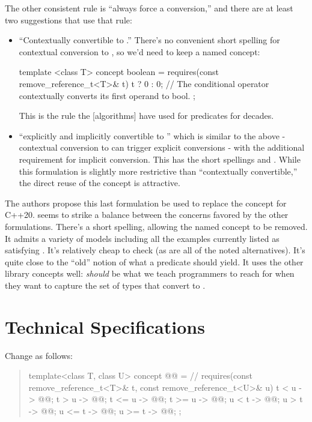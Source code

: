 The other consistent rule is ``always force a conversion,'' and there are at least two suggestions
that use that rule:
\begin{itemize}
\item ``Contextually convertible to .'' There's no convenient short spelling for
  contextual conversion to , so we'd need to keep a named concept:
  \begin{codeblock}
  template <class T>
  concept boolean = requires(const remove_reference_t<T>& t) {
    t ? 0 : 0; // The conditional operator contextually converts its first operand to bool.
  };
  \end{codeblock}
  This is the rule the [algorithms] have used for predicates for decades.
\item ``explicitly and implicitly convertible to '' which is similar to the above -
  contextual conversion to  can trigger explicit conversions - with the additional
  requirement for implicit conversion. This has the short spellings
   and .
  While this formulation is slightly more restrictive than ``contextually convertible,'' the direct
  reuse of the  concept is attractive.
\end{itemize}

The authors propose this last formulation be used to replace the  concept for
C++20.  seems to strike a balance between the concerns
favored by the other formulations. There's a short spelling, allowing the named concept to be
removed. It admits a variety of models including all the examples currently listed as
satisfying . It's relatively cheap to check (as are all of the noted
alternatives). It's quite close to the ``old'' notion of what a predicate should yield. It uses the
other library concepts well:  \emph{should} be what we teach
programmers to reach for when they want to capture the set of types that convert to .

\chapter{Technical Specifications} %
Change  as follows:
\begin{quote}
\begin{codeblock}
template<class T, class U>
concept @@ = // \expos
  requires(const remove_reference_t<T>& t, const remove_reference_t<U>& u) {
    { t <  u } -> @@;
    { t >  u } -> @@;
    { t <= u } -> @@;
    { t >= u } -> @@;
    { u <  t } -> @@;
    { u >  t } -> @@;
    { u <= t } -> @@;
    { u >= t } -> @@;
  };
\end{codeblock}
\end{quote}


